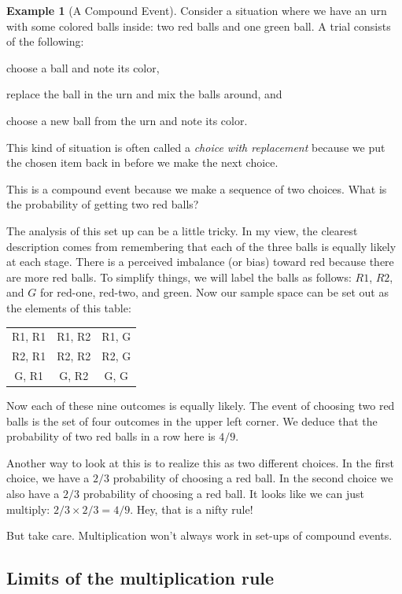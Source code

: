 \documentclass[12pt,letterpaper]{article}
\theoremstyle{definition}
\newtheorem{example}{Example}
\begin{document}
\begin{example}[A Compound Event]
Consider a situation where we have an urn  with some colored balls inside: two red balls and one green ball.
A trial consists of the following:
\begin{compactitem}
\item choose a ball and note its color,
\item replace the ball in the urn and mix the balls around, and 
\item choose a new ball from the urn and note its color.
\end{compactitem}
This kind of situation is often called a \emph{choice with replacement} because we put the chosen item back in before we make the next choice.

This is a compound event because we make a sequence of two choices. 
What is the probability of getting two red balls?

The analysis of this set up can be a little tricky.
In my view, the clearest description comes from remembering that each of the three balls is equally likely at each stage.
There is a perceived imbalance (or bias) toward red because there are more red balls.
To simplify things, we will label the balls as follows: $R1$, $R2$, and $G$ for red-one, red-two, and green.
Now our sample space can be set out as the elements of this table:
\begin{center}
\begin{tabular}{c c c}
R1, R1 & R1, R2 & R1, G \\
R2, R1 & R2, R2 & R2, G \\
G, R1 & G, R2 & G, G 
\end{tabular}
\end{center}
Now each of these nine outcomes is equally likely.
The event of choosing two red balls is the set of four outcomes in the upper left corner.
We deduce that the probability of two red balls in a row here is $4/9$.
\end{example}

Another way to look at this is to realize this as two different choices. 
In the first choice, we have a $2/3$ probability of choosing a red ball. 
In the second choice we also have a $2/3$ probability of choosing a red ball.
It looks like we can just multiply: $2/3 \times 2/3 = 4/9$.
Hey, that is a nifty rule!

But take care.
Multiplication won't always work in set-ups of compound events.

\subsection*{Limits of the multiplication rule} %
\end{document}

